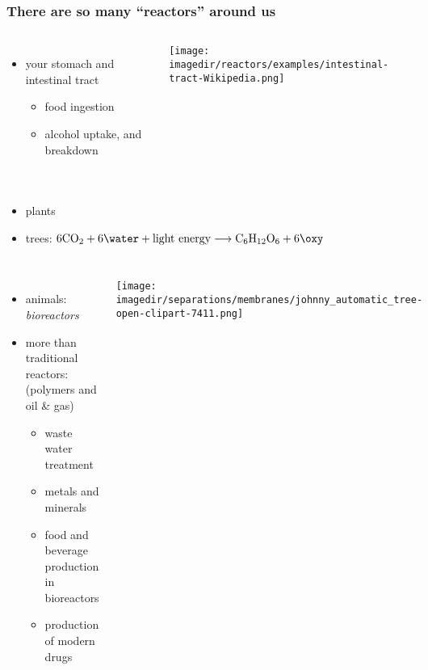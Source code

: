 \begin{frame}\frametitle{There are so many ``reactors'' around us}
	\begin{columns}[t]
			\begin{itemize}
				\item	your stomach and intestinal tract
				\begin{itemize}
					\item	food ingestion
					\item	alcohol uptake, and breakdown
				\end{itemize}
			\end{itemize}
			\vspace{-1.5cm}
			\begin{center}
				\texttt{[image: \\imagedir/reactors/examples/intestinal-tract-Wikipedia.png]}		
			\end{center}
	\end{columns}
	\begin{columns}[t]
			\begin{itemize}
				\item	plants
				\item	trees: $6\text{CO}_2 + 6\water+ \text{light energy} \longrightarrow \text{C}_6\text{H}_{12}\text{O}_6 + 6\oxy$
			\end{itemize}
	\end{columns}
	\begin{columns}[t]
			\begin{itemize}
				\item	animals: \emph{bioreactors}
				\item	more than traditional reactors: (polymers and oil \& gas)
				\begin{itemize}
					\item	waste water treatment
					\item	metals and minerals
					\item	food and beverage production in bioreactors
					\item	production of modern drugs
				\end{itemize}
			\end{itemize}
			\vspace{-0.3cm}
			\begin{center}
				\texttt{[image: \\imagedir/separations/membranes/johnny\_automatic\_tree-open-clipart-7411.png]}
			\end{center}
	\end{columns}
\end{frame}


